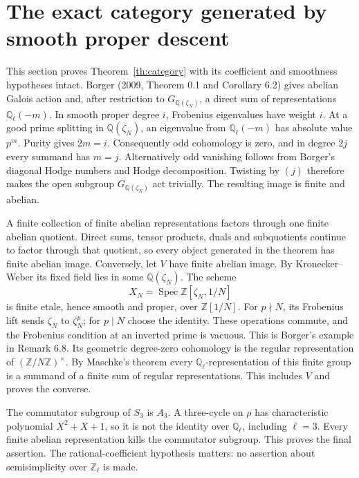 \documentclass[11pt]{article}
\theoremstyle{remark}\newtheorem{remark}[theorem]{Remark}
\newcommand{\Q}{\mathbb Q}\newcommand{\Z}{\mathbb Z}\newcommand{\C}{\mathbb C}
\newcommand{\Spec}{\operatorname{Spec}}\newcommand{\tr}{\operatorname{tr}}
\begin{document}
\section{The exact category generated by smooth proper descent}
This section proves Theorem~\ref{th:category} with its coefficient and smoothness hypotheses intact. Borger (2009, Theorem 0.1 and Corollary 6.2) gives abelian Galois action and, after restriction to $G_{\Q(\zeta_N)}$, a direct sum of representations $\Q_\ell(-m)$. In smooth proper degree $i$, Frobenius eigenvalues have weight $i$. At a good prime splitting in $\Q(\zeta_N)$, an eigenvalue from $\Q_\ell(-m)$ has absolute value $p^m$. Purity gives $2m=i$. Consequently odd cohomology is zero, and in degree $2j$ every summand has $m=j$. Alternatively odd vanishing follows from Borger's diagonal Hodge numbers and Hodge decomposition. Twisting by $(j)$ therefore makes the open subgroup $G_{\Q(\zeta_N)}$ act trivially. The resulting image is finite and abelian.

A finite collection of finite abelian representations factors through one finite abelian quotient. Direct sums, tensor products, duals and subquotients continue to factor through that quotient, so every object generated in the theorem has finite abelian image. Conversely, let $V$ have finite abelian image. By Kronecker--Weber its fixed field lies in some $\Q(\zeta_N)$. The scheme
\[
 X_N=\Spec\Z[\zeta_N,1/N]
\]
is finite etale, hence smooth and proper, over $\Z[1/N]$. For $p\nmid N$, its Frobenius lift sends $\zeta_N$ to $\zeta_N^p$; for $p\mid N$ choose the identity. These operations commute, and the Frobenius condition at an inverted prime is vacuous. This is Borger's example in Remark 6.8. Its geometric degree-zero cohomology is the regular representation of $(\Z/N\Z)^\times$. By Maschke's theorem every $\Q_\ell$-representation of this finite group is a summand of a finite sum of regular representations. This includes $V$ and proves the converse.

The commutator subgroup of $S_3$ is $A_3$. A three-cycle on $\rho$ has characteristic polynomial $X^2+X+1$, so it is not the identity over $\Q_\ell$, including $\ell=3$. Every finite abelian representation kills the commutator subgroup. This proves the final assertion. The rational-coefficient hypothesis matters: no assertion about semisimplicity over $\Z_\ell$ is made.
\end{document}

